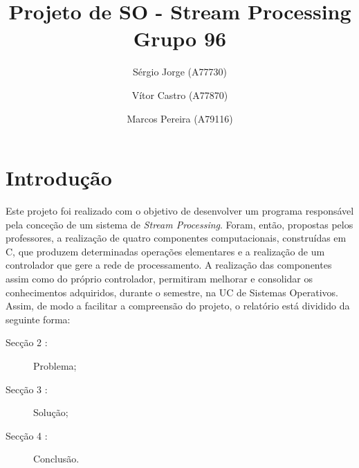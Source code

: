 \documentclass[a4paper]{article}
\title{Projeto de SO - Stream Processing\\Grupo 96}
\author{Sérgio Jorge (A77730) \and Vítor Castro (A77870) \and Marcos Pereira (A79116)}
\date{}
\begin{document}
\maketitle

\begin{abstract}
\end{abstract}

\tableofcontents

\section{Introdução}
\label{sec:intro}

Este projeto foi realizado com o objetivo de desenvolver um programa responsável pela conceção de um sistema de \textit{Stream Processing}. Foram, então, propostas pelos professores, a realização de quatro componentes computacionais, construídas em C, que produzem determinadas operações elementares e a realização de um controlador que gere a rede de processamento. A realização das componentes assim como do próprio controlador, permitiram melhorar e consolidar os conhecimentos adquiridos, durante o semestre, na UC de Sistemas Operativos.
Assim, de modo a facilitar a compreensão do projeto, o relatório está dividido da seguinte forma:

\begin{description}
    \item[Secção 2 :] Problema;
    \item[Secção 3 :] Solução;
    \item[Secção 4 :] Conclusão.
\end{description}
\pagebreak
\end{document}
